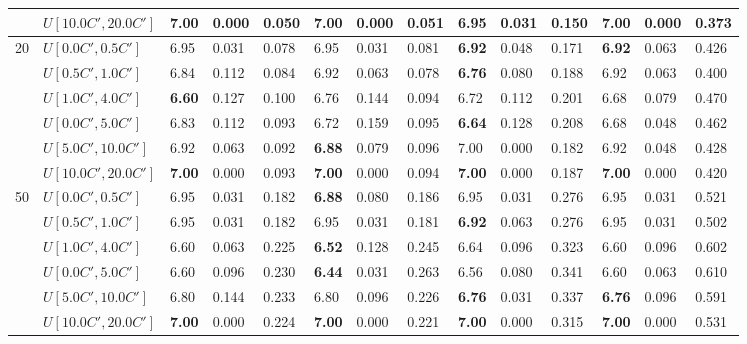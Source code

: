 \begin{table}[h]
{\begin{tabular}{|l|l||l|l|l||l|l|l||l|l|l||l|l|l|}
       & $U[10.0C',20.0C']$ & 7.00 & 0.000 & 0.050 & 7.00 & 0.000 & 0.051 & \textbf{6.95} & 0.031 & 0.150 & 7.00 & 0.000 & 0.373 \\
      \hline\hline
      \multirow{6}{*}{20} & $U[0.0C',0.5C']$ & 6.95 & 0.031 & 0.078 & 6.95 & 0.031 & 0.081 & \textbf{6.92} & 0.048 & 0.171 & \textbf{6.92} & 0.063 & 0.426 \\
       & $U[0.5C',1.0C']$ & 6.84 & 0.112 & 0.084 & 6.92 & 0.063 & 0.078 & \textbf{6.76} & 0.080 & 0.188 & 6.92 & 0.063 & 0.400 \\
       & $U[1.0C',4.0C']$ & \textbf{6.60} & 0.127 & 0.100 & 6.76 & 0.144 & 0.094 & 6.72 & 0.112 & 0.201 & 6.68 & 0.079 & 0.470 \\
       & $U[0.0C',5.0C']$ & 6.83 & 0.112 & 0.093 & 6.72 & 0.159 & 0.095 & \textbf{6.64} & 0.128 & 0.208 & 6.68 & 0.048 & 0.462 \\
       & $U[5.0C',10.0C']$ & 6.92 & 0.063 & 0.092 & \textbf{6.88} & 0.079 & 0.096 & 7.00 & 0.000 & 0.182 & 6.92 & 0.048 & 0.428 \\
       & $U[10.0C',20.0C']$ & \textbf{7.00} & 0.000 & 0.093 & \textbf{7.00} & 0.000 & 0.094 & \textbf{7.00} & 0.000 & 0.187 & \textbf{7.00} & 0.000 & 0.420 \\
      \hline\hline
      \multirow{6}{*}{50} & $U[0.0C',0.5C']$ & 6.95 & 0.031 & 0.182 & \textbf{6.88} & 0.080 & 0.186 & 6.95 & 0.031 & 0.276 & 6.95 & 0.031 & 0.521 \\
       & $U[0.5C',1.0C']$ & 6.95 & 0.031 & 0.182 & 6.95 & 0.031 & 0.181 & \textbf{6.92} & 0.063 & 0.276 & 6.95 & 0.031 & 0.502 \\
       & $U[1.0C',4.0C']$ & 6.60 & 0.063 & 0.225 & \textbf{6.52} & 0.128 & 0.245 & 6.64 & 0.096 & 0.323 & 6.60 & 0.096 & 0.602 \\
       & $U[0.0C',5.0C']$ & 6.60 & 0.096 & 0.230 & \textbf{6.44} & 0.031 & 0.263 & 6.56 & 0.080 & 0.341 & 6.60 & 0.063 & 0.610 \\
       & $U[5.0C',10.0C']$ & 6.80 & 0.144 & 0.233 & 6.80 & 0.096 & 0.226 & \textbf{6.76} & 0.031 & 0.337 & \textbf{6.76} & 0.096 & 0.591 \\
       & $U[10.0C',20.0C']$ & \textbf{7.00} & 0.000 & 0.224 & \textbf{7.00} & 0.000 & 0.221 & \textbf{7.00} & 0.000 & 0.315 & \textbf{7.00} & 0.000 & 0.531 \\
      \hline
      \end{tabular}
            }
      \label{tab:pcpn80}\end{table}


